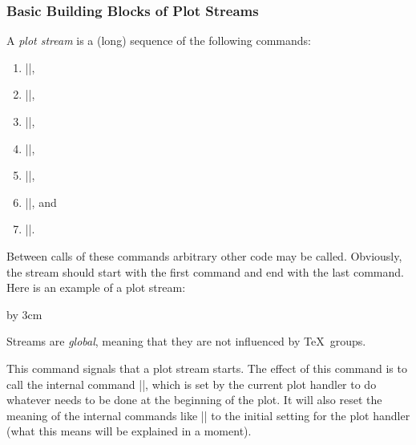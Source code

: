 \subsubsection{Basic Building Blocks of Plot Streams}

A \emph{plot stream} is a (long) sequence of the following commands:
%
\begin{enumerate}
    \item |\pgfplotstreamstart|,
    \item |\pgfplotstreampoint|,
    \item |\pgfplotstreampointoutlier|,
    \item |\pgfplotstreampointundefined|,
    \item |\pgfplotstreamnewdataset|,
    \item |\pgfplotstreamspecial|, and
    \item |\pgfplotstreamend|.
\end{enumerate}
%
Between calls of these commands arbitrary other code may be called. Obviously,
the stream should start with the first command and end with the last command.
Here is an example of a plot stream:
%
\begin{codeexample}
\pgfplotstreamstart
\pgfplotstreampoint{\pgfpoint{1cm}{1cm}}
\newdimen\mydim
\mydim=2cm
\pgfplotstreampoint{\pgfpoint{\mydim}{2cm}}
\advance \mydim by 3cm
\pgfplotstreampoint{\pgfpoint{\mydim}{2cm}}
\pgfplotstreamend
\end{codeexample}

Streams are \emph{global}, meaning that they are not influenced by \TeX\
groups.

\begin{command}{\pgfplotstreamstart}
    This command signals that a plot stream starts. The effect of this command
    is to call the internal command |\pgf@plotstreamstart|, which is set by the
    current plot handler to do whatever needs to be done at the beginning of
    the plot. It will also reset the meaning of the internal commands like
    |\pgf@plotstreampoint| to the initial setting for the plot handler (what
    this means will be explained in a moment).
\end{command}

